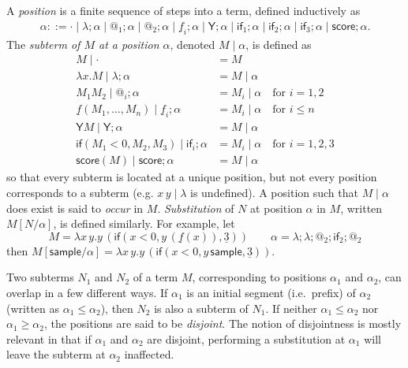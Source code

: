 \documentclass{article}
\newcommand{\tY}{\mathsf{Y}}
\newcommand{\tif}[3]{\mathsf{if}(#1, #2, #3)} %
\newcommand{\tsample}{\mathsf{sample}}
\newcommand{\tscore}{\mathsf{score}}
\theoremstyle{definition}
\theoremstyle{lemma}
\theoremstyle{remark}
\begin{document}
A \emph{position} 
is a finite sequence of steps into a term, defined inductively as
\begin{align*}
\alpha ::= \cdot \mid \lambda ; \alpha \mid @_1 ; \alpha \mid @_2 ; \alpha \mid \underline f_i ; \alpha \mid \tY ; \alpha \mid \textsf{if}_1 ; \alpha \mid \textsf{if}_2 ; \alpha \mid \textsf{if}_3 ; \alpha \mid \tscore ; \alpha.
\end{align*}
The \emph{subterm of $M$ at a position $\alpha$}, denoted $M \mid \alpha$, is defined as
\begin{align*}
M \mid \cdot & = M \\
\lambda x. M \mid \lambda ; \alpha & = M \mid \alpha \\
M_1 M_2 \mid @_i ; \alpha & = M_i \mid \alpha \quad \text{for } i = 1,2 \\
\underline f(M_1,\dots,M_n) \mid \underline f_i ; \alpha & = M_i \mid \alpha \quad \text{for }i \leq n \\
\tY M \mid \tY ; \alpha & = M \mid \alpha \\
\tif{M_1 < 0}{M_2}{M_3} \mid \textsf{if}_i ; \alpha & = M_i \mid \alpha \quad \text{for } i = 1,2,3 \\
\tscore(M) \mid \tscore ; \alpha & = M \mid \alpha
\end{align*}
so that every subterm is located at a unique position, but not every position corresponds to a subterm (e.g. $x \, y \mid \lambda$ is undefined). 
A position such that $M\mid \alpha$ does exist is said to \emph{occur} in $M$. 
\emph{Substitution} of $N$ at position $\alpha$ in $M$, written $M[N/\alpha]$, is defined similarly.
For example, let 
\[
M = \lambda x \, y. y \, (\tif{x < 0}{y \, (\underline f (x))}{\underline 3})
\qquad
\alpha =\lambda ; \lambda ; @_2 ; \textsf{if}_2 ; @_2
\]
then 
\(
M[\tsample / \alpha] = \lambda x \, y. y \, (\tif{x < 0}{y \, \tsample}{\underline 3}).
\)

Two subterms $N_1$ and $N_2$ of a term $M$, corresponding to positions $\alpha_1$ and $\alpha_2$, can overlap in a few different ways. 
If $\alpha_1$ is an initial segment (i.e.~prefix) of $\alpha_2$ (written as $\alpha_1 \leq \alpha_2$), then $N_2$ is also a subterm of $N_1$. If neither $\alpha_1 \leq \alpha_2$ nor $\alpha_1 \geq \alpha_2$, the positions are said to be \emph{disjoint}. 
The notion of disjointness is mostly relevant in that if $\alpha_1$ and $\alpha_2$ are disjoint, performing a substitution at $\alpha_1$ will leave the subterm at $\alpha_2$ inaffected.
  
\end{document}
